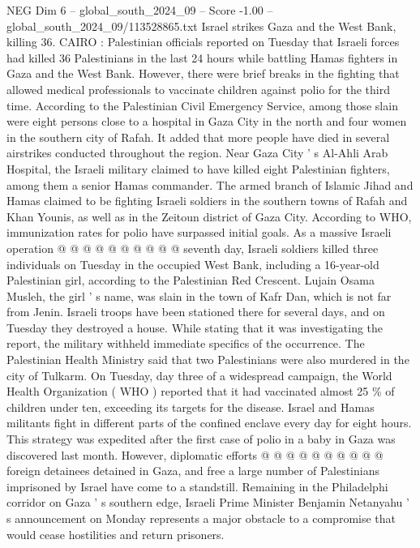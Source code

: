 \begin{textsample}{NEG Dim 6 – global\_south\_2024\_09 – Score -1.00 – global\_south\_2024\_09/113528865.txt}  \label{ex:f6_neg_014}
Israel strikes Gaza and the West Bank, killing 36.
CAIRO : Palestinian officials reported on Tuesday that Israeli forces had killed 36 Palestinians in the last 24 hours while battling Hamas fighters in Gaza and the West Bank.
However, there were brief breaks in the fighting that allowed medical professionals to vaccinate children against polio for the third time.
According to the Palestinian Civil Emergency Service, among those slain were eight persons close to a hospital in Gaza City in the north and four women in the southern city of Rafah.
It added that more people have died in several airstrikes conducted throughout the region.
Near Gaza City ' s Al-Ahli Arab Hospital, the Israeli military claimed to have killed eight Palestinian fighters, among them a senior Hamas commander.
The armed branch of Islamic Jihad and Hamas claimed to be fighting Israeli soldiers in the southern towns of Rafah and Khan Younis, as well as in the Zeitoun district of Gaza City.
According to WHO, immunization rates for polio have surpassed initial goals.
As a massive Israeli operation @ @ @ @ @ @ @ @ @ @ seventh day, Israeli soldiers killed three individuals on Tuesday in the occupied West Bank, including a 16-year-old Palestinian girl, according to the Palestinian Red Crescent.
Lujain Osama Musleh, the girl ' s name, was slain in the town of Kafr Dan, which is not far from Jenin.
Israeli troops have been stationed there for several days, and on Tuesday they destroyed a house.
While stating that it was investigating the report, the military withheld immediate specifics of the occurrence.
The Palestinian Health Ministry said that two Palestinians were also murdered in the city of Tulkarm.
On Tuesday, day three of a widespread campaign, the World Health Organization ( WHO ) reported that it had vaccinated almost 25 \% of children under ten, exceeding its targets for the disease.
Israel and Hamas militants fight in different parts of the confined enclave every day for eight hours.
This strategy was expedited after the first case of polio in a baby in Gaza was discovered last month.
However, diplomatic efforts @ @ @ @ @ @ @ @ @ @ foreign detainees detained in Gaza, and free a large number of Palestinians imprisoned by Israel have come to a standstill.
Remaining in the Philadelphi corridor on Gaza ' s southern edge, Israeli Prime Minister Benjamin Netanyahu ' s announcement on Monday represents a major obstacle to a compromise that would cease hostilities and return prisoners.

\end{textsample}
